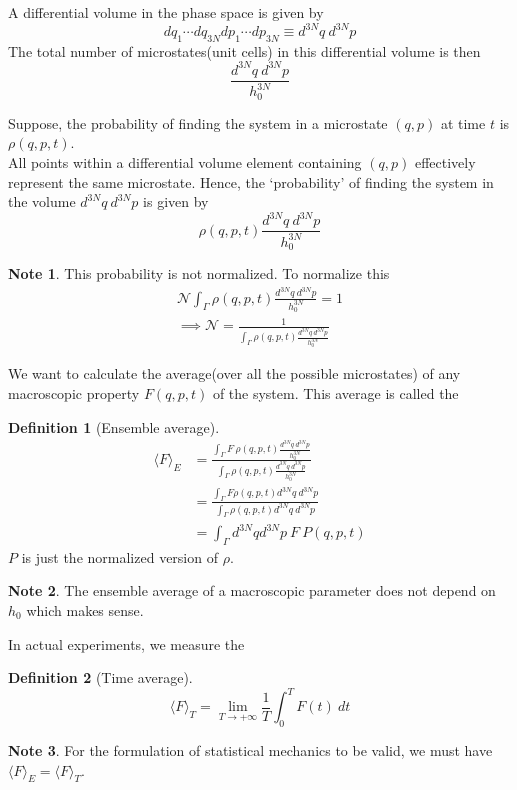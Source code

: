 \documentclass[10pt, a4paper]{extarticle}
\theoremstyle{definition}
\newtheorem{defn}{Definition}
\newtheorem*{note*}{Note}
\begin{document}
A differential volume in the phase space is given by
\[dq_1\cdots dq_{3N}dp_1\cdots dp_{3N}\equiv d^{3N}q\ d^{3N}p\]
The total number of microstates(unit cells) in this differential volume is then
\[\frac{d^{3N}q\ d^{3N}p}{h_0^{3N}}\]
\begin{framed}
Suppose, the probability of finding the system in a microstate $(q,p)$ at time $t$ is $\rho(q,p,t)$.\\
All points within a differential volume element containing $(q,p)$ effectively represent the same microstate. Hence, the `probability' of finding the system in the volume $d^{3N}q\ d^{3N}p$ is given by \[\rho(q,p,t)\frac{d^{3N}q\ d^{3N}p}{h_0^{3N}}\]
\begin{note*}
	This probability is not normalized. To normalize this
	\begin{align*}
		\mathcal{N}\int_{\Gamma}\rho(q,p,t)\frac{d^{3N}q\ d^{3N}p}{h_0^{3N}}=1\\
		\implies \mathcal{N}=\frac{1}{\int_{\Gamma}\rho(q,p,t)\frac{d^{3N}q\ d^{3N}p}{h_0^{3N}}}
	\end{align*}
\end{note*}
\end{framed}
We want to calculate the average(over all the possible microstates) of any macroscopic property $F(q,p,t)$ of the system. This average is called the
\begin{framed}
	\begin{defn}[Ensemble average]
		\begin{align*}
			\langle F\rangle_E&=\frac{\int_{\Gamma}F\ \rho(q,p,t)\frac{d^{3N}q\ d^{3N}p}{h_0^{3N}}}{\int_{\Gamma}\rho(q,p,t)\frac{d^{3N}q\ d^{3N}p}{h_0^{3N}}}\\
							  &=\frac{\int_{\Gamma}F\rho(q,p,t)d^{3N}q\ d^{3N}p}{\int_{\Gamma}\rho(q,p,t)d^{3N}q\ d^{3N}p}\\
							  &=\int_{\Gamma}d^{3N}qd^{3N}p\ F\ P(q,p,t)
		\end{align*}
		$P$ is just the normalized version of $\rho$.
	\end{defn}
	\begin{note*}
		The ensemble average of a macroscopic parameter does not depend on $h_0$ which makes sense.
	\end{note*}
\end{framed}

In actual experiments, we measure the
\begin{framed}
	\begin{defn}[Time average]
		\[\langle F\rangle_T=\lim_{T\to +\infty}\frac{1}{T}\int_0^T F(t)\ dt\]
	\end{defn}
\end{framed}
\begin{note*}
	For the formulation of statistical mechanics to be valid, we must have $\langle F\rangle_E=\langle F\rangle_T$.
\end{note*}
\end{document}
